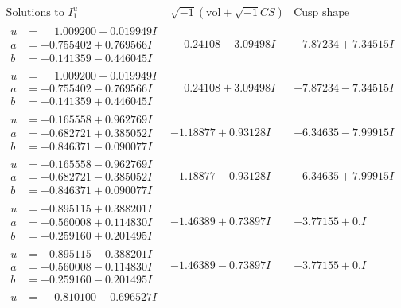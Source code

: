 \documentclass[1p]{elsarticle_modified}
\theoremstyle{definition}
\newcommand{\I}{\sqrt{-1}}
\begin{document}
$$\begin{array}{c|c|c}  
\text{Solutions to }I^u_{1}& \I (\text{vol} + \sqrt{-1}CS) & \text{Cusp shape}\\
 \hline 
\begin{aligned}
u &= \phantom{-}1.009200 + 0.019949 I \\
a &= -0.755402 + 0.769566 I \\
b &= -0.141359 - 0.446045 I\end{aligned}
 & \phantom{-}0.24108 - 3.09498 I & -7.87234 + 7.34515 I \\ \hline\begin{aligned}
u &= \phantom{-}1.009200 - 0.019949 I \\
a &= -0.755402 - 0.769566 I \\
b &= -0.141359 + 0.446045 I\end{aligned}
 & \phantom{-}0.24108 + 3.09498 I & -7.87234 - 7.34515 I \\ \hline\begin{aligned}
u &= -0.165558 + 0.962769 I \\
a &= -0.682721 + 0.385052 I \\
b &= -0.846371 - 0.090077 I\end{aligned}
 & -1.18877 + 0.93128 I & -6.34635 - 7.99915 I \\ \hline\begin{aligned}
u &= -0.165558 - 0.962769 I \\
a &= -0.682721 - 0.385052 I \\
b &= -0.846371 + 0.090077 I\end{aligned}
 & -1.18877 - 0.93128 I & -6.34635 + 7.99915 I \\ \hline\begin{aligned}
u &= -0.895115 + 0.388201 I \\
a &= -0.560008 + 0.114830 I \\
b &= -0.259160 + 0.201495 I\end{aligned}
 & -1.46389 + 0.73897 I & -3.77155 + 0. I\phantom{ +0.000000I} \\ \hline\begin{aligned}
u &= -0.895115 - 0.388201 I \\
a &= -0.560008 - 0.114830 I \\
b &= -0.259160 - 0.201495 I\end{aligned}
 & -1.46389 - 0.73897 I & -3.77155 + 0. I\phantom{ +0.000000I} \\ \hline\begin{aligned}
u &= \phantom{-}0.810100 + 0.696527 I \\

\end{aligned}
\end{array}$$
\end{document}
